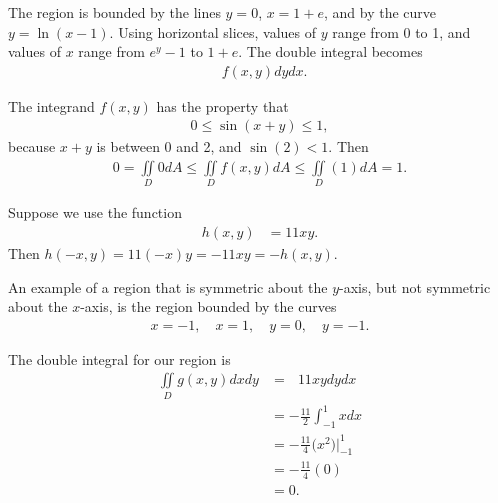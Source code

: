 \documentclass{article}
\begin{document}
The region is bounded by the lines $y=0$, $x=1+e$, and by the curve $y=\ln(x-1)$. Using horizontal slices, values of $y$ range from 0 to 1, and values of $x$ range from $e^y-1$ to $1+e$. The double integral becomes
\begin{align*}
  \mathop{\int_{0}^{1} \! \int_{e^y-1}^{1+e}} f(x,y) dydx .
\end{align*}
\item %
The integrand $f(x,y)$ has the property that 
\begin{align*}
  0 \le \sin(x+y) \le 1,
\end{align*}
because $x+y$ is between 0 and 2, and $\sin(2) < 1$. Then 
\begin{align*}
  0 = \iint\limits_D 0 dA  \le  \iint\limits_D f(x,y) dA \le  \iint\limits_D (1) dA = 1.
\end{align*}
\item %
\BEN
\item 
Suppose we use the function
\begin{align*}
 h(x,y) & = 11xy.
\end{align*}
Then $h(-x,y) = 11(-x)y = -11xy = -h(x,y)$. 
\item An example of a region that is symmetric about the $y$-axis, but not symmetric about the $x$-axis, is the region bounded by the curves
\begin{align*}
  x = -1,  \quad x = 1, \quad y = 0, \quad y = - 1.
\end{align*}
\item The double integral for our region is
\begin{align*}
  \iint\limits_D g(x,y) dxdy 
  &=  \mathop{\int_{-1}^1 \! \int_{-1}^0} 11xy dydx\\
  &=  -\frac{11}{2} \int_{-1}^1 x dx\\
  &=  -\frac{11}{4} \Big(x^2 \Big)\Big|_{-1}^{1} \\
  &=  -\frac{11}{4} (0)\\
  &= 0.
\end{align*}
\EEN
\EEN %
\end{document}
